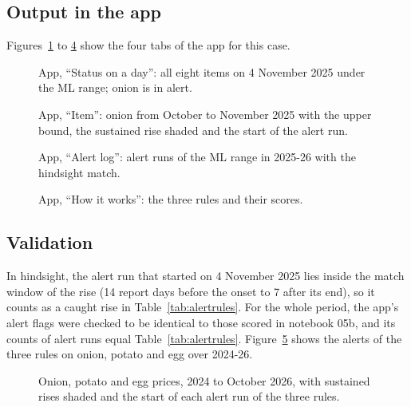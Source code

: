 \subsection{Output in the app}
Figures~\ref{fig:app-status} to \ref{fig:app-how} show the four tabs of the app for this case.

\begin{figure}[H]
\centering
{}
\caption[App: status on a day]{App, ``Status on a day'': all eight items on 4 November 2025 under the ML range; onion is in alert.}
\label{fig:app-status}
\end{figure}

\begin{figure}[H]
\centering
{}
\caption[App: item chart]{App, ``Item'': onion from October to November 2025 with the upper bound, the sustained rise shaded and the start of the alert run.}
\label{fig:app-item}
\end{figure}

\begin{figure}[H]
\centering
{}
\caption[App: alert log]{App, ``Alert log'': alert runs of the ML range in 2025-26 with the hindsight match.}
\label{fig:app-log}
\end{figure}

\begin{figure}[H]
\centering
{}
\caption[App: how it works]{App, ``How it works'': the three rules and their scores.}
\label{fig:app-how}
\end{figure}

\subsection{Validation}
In hindsight, the alert run that started on 4 November 2025 lies inside the match window of the rise (14 report days before the onset to 7 after its end), so it counts as a caught rise in Table~\ref{tab:alertrules}. For the whole period, the app's alert flags were checked to be identical to those scored in notebook 05b, and its counts of alert runs equal Table~\ref{tab:alertrules}. Figure~\ref{fig:f5} shows the alerts of the three rules on onion, potato and egg over 2024-26.

\begin{figure}[H]
\centering
{}
\caption[Prices with alerts for onion, potato and egg]{Onion, potato and egg prices, 2024 to October 2026, with sustained rises shaded and the start of each alert run of the three rules.}
\label{fig:f5}
\end{figure}



